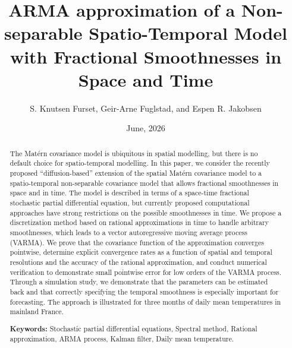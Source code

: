 \documentclass[12pt]{article} %
\begin{document}
\title{ARMA approximation of a Non-separable Spatio-Temporal Model with Fractional Smoothnesses in Space and Time}

\date{June, 2026}

\author{S. Knutsen Furset, Geir-Arne Fuglstad, and Espen R.
Jakobsen}


\maketitle






\begin{abstract}The Matérn covariance model is ubiquitous
in spatial modelling, but there is no default choice
for spatio-temporal modelling. In this paper, we consider
the recently proposed ``diffusion-based'' extension of the spatial Matérn covariance model to a spatio-temporal non-separable covariance model that allows fractional smoothnesses in space and in time. The model is described in terms of a  space-time fractional stochastic partial differential equation, but currently proposed computational approaches have strong restrictions on the possible smoothnesses in time. We propose a discretization method based on rational approximations in time to handle arbitrary smoothnesses, which leads
to a vector autoregressive moving average process (VARMA). We prove that the covariance function of the approximation converges pointwise, determine explicit convergence rates as a function of spatial and temporal resolutions and the accuracy of the rational approximation, and conduct numerical verification to demonstrate small pointwise error for low orders of the VARMA process. Through a simulation study, we demonstrate that the parameters can be estimated back and that correctly specifying the temporal smoothness is especially important for forecasting. The approach is illustrated for three months of daily mean temperatures in mainland France.

\vspace{0.4cm}
\noindent\textbf{Keywords:} Stochastic partial differential equations, Spectral method, Rational approximation, ARMA process, Kalman filter, Daily mean temperature.
\end{abstract}
\end{document}
